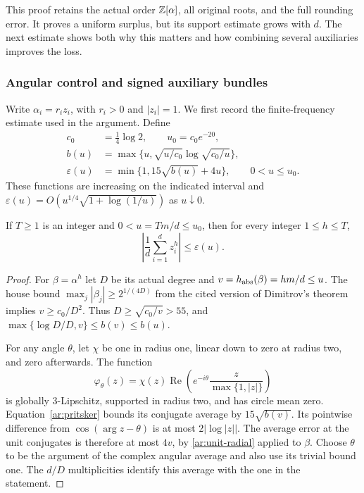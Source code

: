 This proof retains the actual order $\mathbb Z[\alpha]$, all original roots, and the full rounding error.
It proves a uniform surplus, but its support estimate grows with $d$.
The next estimate shows both why this matters and how combining several auxiliaries improves the loss.

\subsubsection{Angular control and signed auxiliary bundles}
\label{ar:bundles}

Write $\alpha_i=r_i z_i$, with $r_i>0$ and $|z_i|=1$.
We first record the finite-frequency estimate used in the argument.
Define
\begin{equation}
 \begin{split}
 c_0&=\tfrac14\log2,\qquad u_0=c_0e^{-20},\\
 b(u)&=\max\{u,\sqrt{u/c_0}\log\sqrt{c_0/u}\},\\
 \varepsilon(u)&=\min\{1,15\sqrt{b(u)}+4u\},
                    \qquad 0<u\le u_0.
 \end{split}
 \label{ar:epsilon}
\end{equation}
These functions are increasing on the indicated interval and $\varepsilon(u)=O(u^{1/4}\sqrt{1+\log(1/u)})$ as $u\downarrow0$.

\begin{lemma}\label{ar:angular}
If $T\ge1$ is an integer and $0<u=Tm/d\le u_0$, then for every integer $1\le h\le T$,
\[
 \left|\frac1d\sum_{i=1}^d z_i^h\right|\le\varepsilon(u).
\]
\end{lemma}

\begin{proof}
For $\beta=\alpha^h$ let $D$ be its actual degree and $v=h_{\rm abs}(\beta)=hm/d\le u$.
The house bound $\max_j|\beta_j|\ge2^{1/(4D)}$ from the cited version of Dimitrov's theorem \cite[Theorem~1]{Dim19} implies $v\ge c_0/D^2$.
Thus $D\ge\sqrt{c_0/v}>55$, and $\max\{\log D/D,v\}\le b(v)\le b(u)$.

For any angle $\theta$, let $\chi$ be one in radius one, linear down to zero at radius two, and zero afterwards.
The function
\[
 \varphi_\theta(z)=\chi(z)\operatorname{Re}
          \left(e^{-i\theta}\frac{z}{\max\{1,|z|\}}\right)
\]
is globally $3$-Lipschitz, supported in radius two, and has circle mean zero.
Equation~\eqref{ar:pritsker} bounds its conjugate average by $15\sqrt{b(v)}$.
Its pointwise difference from $\cos(\arg z-\theta)$ is at most $2|\log|z||$.
The average error at the unit conjugates is therefore at most $4v$, by \eqref{ar:unit-radial} applied to $\beta$.
Choose $\theta$ to be the argument of the complex angular average and also use its trivial bound one.
The $d/D$ multiplicities identify this average with the one in the statement.
\end{proof}

